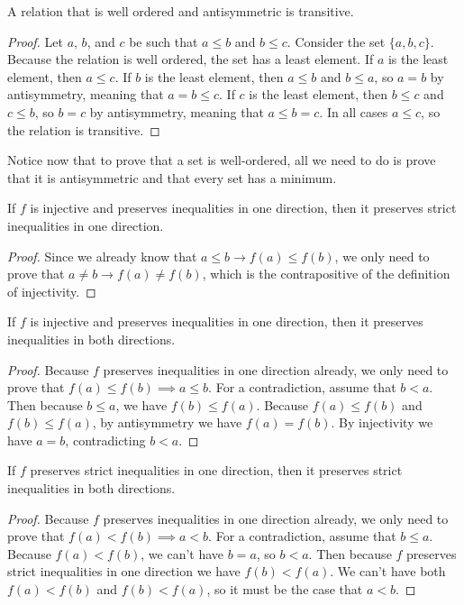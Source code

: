 \documentclass[../../math.tex]{subfiles}
\begin{document}
\begin{instance} \label{wo_trans}
    A relation that is well ordered and antisymmetric is transitive.
\end{instance}
\begin{proof}
    Let $a$, $b$, and $c$ be such that $a \leq b$ and $b \leq c$.  Consider the
    set $\{a, b, c\}$.  Because the relation is well ordered, the set has a
    least element.  If $a$ is the least element, then $a \leq c$.  If $b$ is the
    least element, then $a \leq b$ and $b \leq a$, so $a = b$ by antisymmetry,
    meaning that $a = b \leq c$.  If $c$ is the least element, then $b \leq c$
    and $c \leq b$, so $b = c$ by antisymmetry, meaning that $a \leq b = c$.  In
    all cases $a \leq c$, so the relation is transitive.
\end{proof}

Notice now that to prove that a set is well-ordered, all we need to do is prove
that it is antisymmetric and that every set has a minimum.

\begin{instance} \label{homo_le_lt}
    If $f$ is injective and preserves inequalities in one direction, then it
    preserves strict inequalities in one direction.
\end{instance}
\begin{proof}
    Since we already know that $a \leq b \rightarrow f(a) \leq f(b)$, we only
    need to prove that $a \neq b \rightarrow f(a) \neq f(b)$, which is the
    contrapositive of the definition of injectivity.
\end{proof}

\begin{instance} \label{homo_le_le2}
    If $f$ is injective and preserves inequalities in one direction, then it
    preserves inequalities in both directions.
\end{instance}
\begin{proof}
    Because $f$ preserves inequalities in one direction already, we only need to
    prove that $f(a) \leq f(b) \implies a \leq b$.  For a contradiction, assume
    that $b < a$.  Then because $b \leq a$, we have $f(b) \leq f(a)$.  Because
    $f(a) \leq f(b)$ and $f(b) \leq f(a)$, by antisymmetry we have $f(a) =
    f(b)$.  By injectivity we have $a = b$, contradicting $b < a$.
\end{proof}

\begin{instance} \label{homo_lt_lt2}
    If $f$ preserves strict inequalities in one direction, then it preserves
    strict inequalities in both directions.
\end{instance}
\begin{proof}
    Because $f$ preserves inequalities in one direction already, we only need to
    prove that $f(a) < f(b) \implies a < b$.  For a contradiction, assume that
    $b \leq a$.  Because $f(a) < f(b)$, we can't have $b = a$, so $b < a$.  Then
    because $f$ preserves strict inequalities in one direction we have $f(b) <
    f(a)$.  We can't have both $f(a) < f(b)$ and $f(b) < f(a)$, so it must be
    the case that $a < b$.
\end{proof}
\end{document}
